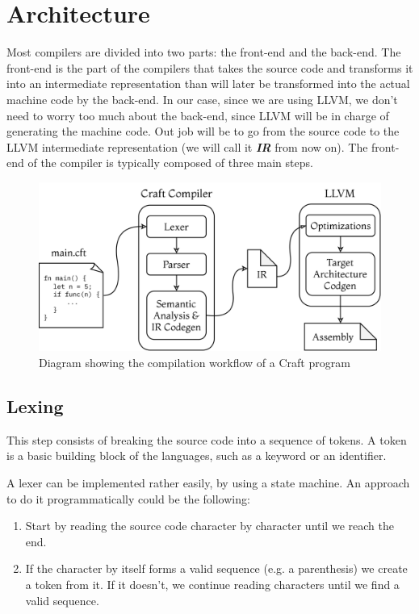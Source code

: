 ﻿\documentclass[10pt,a4paper,twocolumn,twoside]{article}
\begin{document}
\section{Architecture}
Most compilers are divided into two parts: the front-end and the back-end. The
front-end is the part of the compilers that takes the source code and transforms
it into an intermediate representation than will later be transformed into the
actual machine code by the back-end. In our case, since we are using LLVM, we
don't need to worry too much about the back-end, since LLVM will be in charge of
generating the machine code. Out job will be to go from the source code to the
LLVM intermediate representation (we will call it \textbf{\textit{IR}} from now
on). The front-end of the compiler is typically composed of three main steps.

\begin{figure}[ht]
\centering
\captionsetup{justification=centering,margin=1cm}
\includegraphics[width=\linewidth]{arch}
\caption{Diagram showing the compilation workflow of a Craft program}
\end{figure}

\subsection{Lexing} 
This step consists of breaking the source code into a sequence of tokens. A
token is a basic building block of the languages, such as a keyword or an
identifier.

A lexer can be implemented rather easily, by using a state machine. An approach
to do it programmatically could be the following:

\begin{enumerate}
    \item Start by reading the source code character by character until we reach
        the end.
    \item If the character by itself forms a valid sequence (e.g. a parenthesis)
        we create a token from it. If it doesn't, we continue reading characters
        until we find a valid sequence. 
\end{enumerate}
\end{document}
